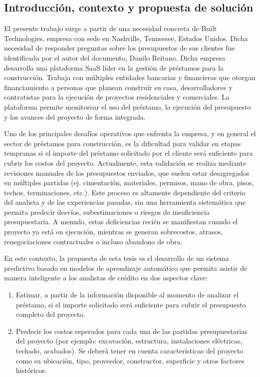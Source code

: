 \documentclass[
11pt, %
]{charter}
\begin{document}
\subsection*{Introducción, contexto y propuesta de solución}

El presente trabajo surge a partir de una necesidad concreta de Built Technologies, empresa con sede en Nashville, Tennessee, Estados Unidos. Dicha necesidad de responder preguntas sobre los presupuestos de sus clientes fue identificada por el autor del documento, Danilo Reitano. Dicha empresa desarrolla una plataforma SaaS líder en la gestión de préstamos para la construcción. Trabaja con múltiples entidades bancarias y financieras que otorgan financiamiento a personas que planean construír su casa, desarrolladores y contratistas para la ejecución de proyectos residenciales y comerciales. La plataforma permite monitorear el uso del préstamo, la ejecución del presupuesto y los avances del proyecto de forma integrada.

Uno de los principales desafíos operativos que enfrenta la empresa, y en general el sector de préstamos para construcción, es la dificultad para validar en etapas tempranas si el importe del préstamo solicitado por el cliente será suficiente para cubrir los costos del proyecto. Actualmente, esta validación se realiza mediante revisiones manuales de los presupuestos enviados, que suelen estar desagregados en múltiples partidas (ej. cimentación, materiales, permisos, mano de obra, pisos, techos, terminaciones, etc.). Este proceso es altamente dependiente del criterio del analista y de las experiencias pasadas, sin una herramienta sistemática que permita predecir desvíos, subestimaciones o riesgos de insuficiencia presupuestaria. A menudo, estas deficiencias recién se manifiestan cuando el proyecto ya está en ejecución, mientras se generan sobrecostos, atrasos, renegociaciones contractuales o incluso abandono de obra.

En este contexto, la propuesta de esta tesis es el desarrollo de un sistema predictivo basado en modelos de aprendizaje automático que permita asistir de manera inteligente a los analistas de crédito en dos aspectos clave:

\begin{enumerate}
    \item Estimar, a partir de la información disponible al momento de analizar el préstamo, si el importe solicitado será suficiente para cubrir el presupuesto completo del proyecto.
    \item Predecir los costos esperados para cada una de las partidas presupuestarias del proyecto (por ejemplo: excavación, estructura, instalaciones eléctricas, techado, acabados). Se deberá tener en cuenta características del proyecto como su ubicación, tipo, proveedor, constructor, superficie y otros factores históricos.
\end{enumerate}
\end{document}
